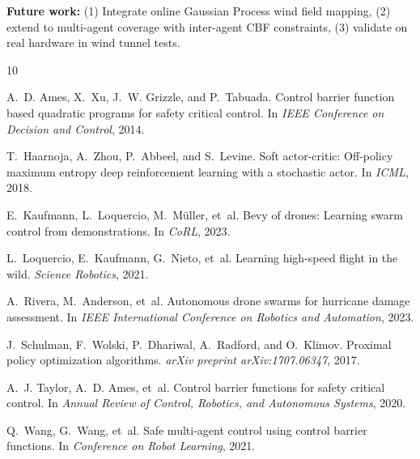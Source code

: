 \documentclass[10pt,twocolumn]{article}
\begin{document}
\textbf{Future work:} (1) Integrate online Gaussian Process wind field mapping, (2) extend to multi-agent coverage with inter-agent CBF constraints, (3) validate on real hardware in wind tunnel tests.


\begin{thebibliography}{10}

A.~D. Ames, X.~Xu, J.~W. Grizzle, and P.~Tabuada.
\newblock Control barrier function based quadratic programs for safety critical
  control.
\newblock In \emph{IEEE Conference on Decision and Control}, 2014.

T.~Haarnoja, A.~Zhou, P.~Abbeel, and S.~Levine.
\newblock Soft actor-critic: Off-policy maximum entropy deep reinforcement
  learning with a stochastic actor.
\newblock In \emph{ICML}, 2018.

E.~Kaufmann, L.~Loquercio, M.~M\"uller, et~al.
\newblock Bevy of drones: Learning swarm control from demonstrations.
\newblock In \emph{CoRL}, 2023.

L.~Loquercio, E.~Kaufmann, G.~Nieto, et~al.
\newblock Learning high-speed flight in the wild.
\newblock \emph{Science Robotics}, 2021.

A.~Rivera, M.~Anderson, et~al.
\newblock Autonomous drone swarms for hurricane damage assessment.
\newblock In \emph{IEEE International Conference on Robotics and Automation}, 2023.

J.~Schulman, F.~Wolski, P.~Dhariwal, A.~Radford, and O.~Klimov.
\newblock Proximal policy optimization algorithms.
\newblock \emph{arXiv preprint arXiv:1707.06347}, 2017.

A.~J. Taylor, A.~D. Ames, et~al.
\newblock Control barrier functions for safety critical control.
\newblock In \emph{Annual Review of Control, Robotics, and Autonomous Systems}, 2020.

Q.~Wang, G.~Wang, et~al.
\newblock Safe multi-agent control using control barrier functions.
\newblock In \emph{Conference on Robot Learning}, 2021.

\end{thebibliography}
\end{document}
